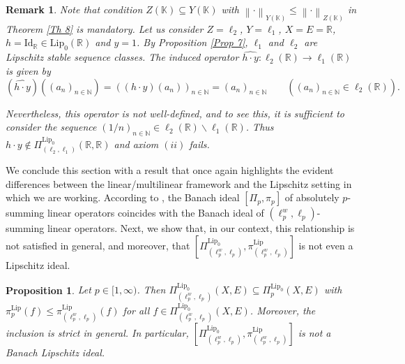 \documentclass[12pt]{amsart}
\newtheorem{proposition}[theorem]{Proposition}
\newtheorem{remark}[theorem]{Remark}
\def\R{\mathbb{R}}
\def\K{\mathbb{K}}
\def\N{\mathbb{N}}
\def\Lip{\mathrm{Lip}_0}
\def\Lipnorm{\mathrm{Lip}}
\begin{document}
\begin{remark}
Note that condition $Z(\K) \subseteq Y(\K)$ with $\left\|\cdot\right\|_{Y(\K)} \leq \left\|\cdot\right\|_{Z(\K)}$ in Theorem \ref{Th 8} is mandatory. Let us consider $Z=\ell_2$, $Y=\ell_1$, $X=E=\R$, $h=\mathrm{Id}_\R \in \Lip(\R)$ and $y=1$. By Proposition \ref{Prop 7}, $\ell_1$ and $\ell_2$ are Lipschitz stable sequence classes. The induced operator $\widehat{h \cdot y}: \ell_2(\R) \to \ell_1(\R)$ is given by
$$
(\widehat{h \cdot y})((a_n)_{n\in\N}) = ((h \cdot y)(a_n))_{n\in\N} = (a_n)_{n\in\N} \qquad ((a_n)_{n\in\N} \in \ell_2(\R)).
$$

Nevertheless, this operator is not well-defined, and to see this, it is sufficient to consider the sequence $(1/n)_{n\in\N} \in \ell_2(\R)\backslash \ell_1(\R)$. Thus $h \cdot y \notin \Pi_{(\ell_2,\ell_1)}^{\Lip}(\R,\R)$ and axiom $(ii)$ fails.
\end{remark}

We conclude this section with a result that once again highlights the evident differences between the linear/multilinear framework and the Lipschitz setting in which we are working. According to \cite[Example 2.11]{BotCamNas-24}, the Banach ideal $[\Pi_p,\pi_p]$ of absolutely $p$-summing linear operators coincides with the Banach ideal of $(\ell_p^w,\ell_p)$-summing linear operators. Next, we show that, in our context, this relationship is not satisfied in general, and moreover, that $[\Pi_{(\ell_p^w,\ell_p)}^{\Lip},\pi_{(\ell_p^w,\ell_p)}^{\Lipnorm}]$ is not even a Lipschitz ideal.

\begin{proposition}\label{Prop 12}
	Let $p \in [1,\infty)$. Then $\Pi_{(\ell_p^w,\ell_p)}^{\Lip}(X,E) \subseteq \Pi_p^{\Lip}(X,E)$ with $\pi_p^{\Lipnorm}(f)\leq \pi_{(\ell_p^w,\ell_p)}^{\Lipnorm}(f)$ for all $f \in \Pi_{(\ell_p^w,\ell_p)}^{\Lip}(X,E)$. Moreover, the inclusion is strict in general. In particular, $[\Pi_{(\ell_p^w,\ell_p)}^{\Lip},\pi_{(\ell_p^w,\ell_p)}^{\Lipnorm}]$ is not a Banach Lipschitz ideal.
\end{proposition}
\end{document}
